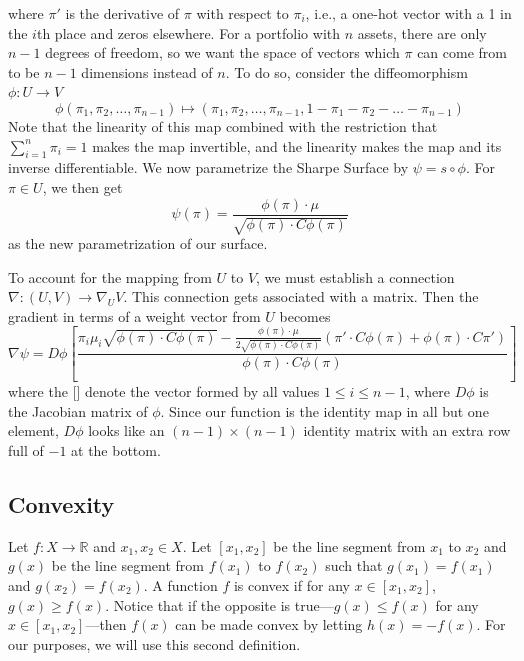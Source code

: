 \documentclass{article}
\begin{document}
%
where $\pi'$ is the derivative of $\pi$ with respect to $\pi_i$, i.e., a one-hot vector with a 1 in the $i$th place and zeros elsewhere.
For a portfolio with $n$ assets, there are only $n-1$ degrees of freedom, so we want the space of vectors which $\pi$ can come from to be $n-1$ dimensions instead of $n$.  To do so, consider the diffeomorphism $\phi : U \rightarrow V$
\[\phi(\pi_1, \pi_2, \dots, \pi_{n-1}) \mapsto (\pi_1, \pi_2, \dots, \pi_{n-1}, 1 - \pi_1 - \pi_2 - \dots - \pi_{n-1})\]
Note that the linearity of this map combined with the restriction that $\sum_{i=1}^n \pi_i = 1$ makes the map invertible, and the linearity makes the map and its inverse differentiable.
We now parametrize the Sharpe Surface by $\psi = s \circ \phi$.  For $\pi \in U$, we then get
\[\psi(\pi) = \frac{\phi(\pi) \cdot \mu}{\sqrt{\phi(\pi) \cdot C \phi(\pi)}} \]
as the new parametrization of our surface.

To account for the mapping from $U$ to $V$, we must establish a connection $\nabla :(U,V)\rightarrow \nabla_U V$.  This connection gets associated with a matrix.
Then the gradient in terms of a weight vector from $U$ becomes
\[\nabla \psi= D\phi [\frac{\pi_i \mu_i \sqrt{\phi(\pi) \cdot C \phi(\pi) } - \frac{ \phi(\pi)  \cdot \mu}{2\sqrt{\phi(\pi)  \cdot C \phi(\pi) }}(\pi'\cdot C \phi(\pi)  + \phi(\pi)  \cdot C\pi') }{\phi(\pi)  \cdot C \phi(\pi) }]\]
where the [] denote the vector formed by all values $1\leq i \leq n-1$, where $D\phi$ is the Jacobian matrix of $\phi$.  Since our function is the identity map in all but one element, $D\phi$ looks like an $(n-1)\times (n-1)$ identity matrix with an extra row full of $-1$ at the bottom.

\subsection{Convexity}
Let $f: X \rightarrow \mathbb{R}$ and $x_1, x_2 \in X$.  Let $[x_1, x_2]$ be the line segment from $x_1$ to $x_2$ and $g(x)$ be the line segment from $f(x_1)$ to $f(x_2)$ such that $g(x_1)=f(x_1)$ and $g(x_2)=f(x_2)$.
A function $f$ is convex if for any $x\in [x_1, x_2]$, $g(x) \geq f(x)$.  
Notice that if the opposite is true---$g(x) \leq f(x)$ for any $x\in [x_1, x_2]$---then $f(x)$ can be made convex by letting $h(x)=-f(x)$.  For our purposes, we will use this second definition.
\end{document}
